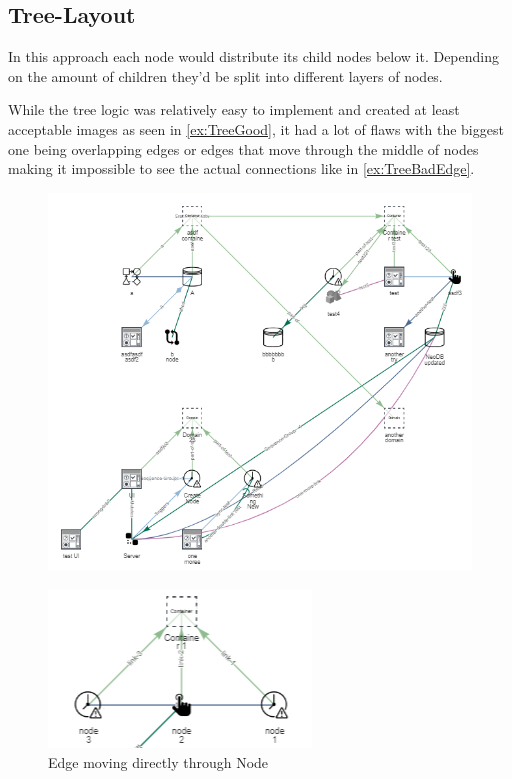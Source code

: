 \subsection{Tree-Layout}
In this approach each node would distribute its child nodes below it. Depending on the amount of children they'd be split into different layers of nodes.

While the tree logic was relatively easy to implement and created at least acceptable images as seen in \autoref{ex:TreeGood}, it had a lot of flaws with the biggest one being overlapping edges or edges that move through the middle of nodes making it impossible to see the actual connections like in \autoref{ex:TreeBadEdge}.

\begin{figure}[H]
\centering
\includegraphics[scale=.7]{Bilder/TreeGood.png}
\label{ex:TreeGood}
\end{figure}

\begin{figure}[H] 
\centering
\includegraphics[scale=1]{Bilder/TreeBad.png}
\caption{Edge moving directly through Node}
\label{ex:TreeBadEdge}
\end{figure}

